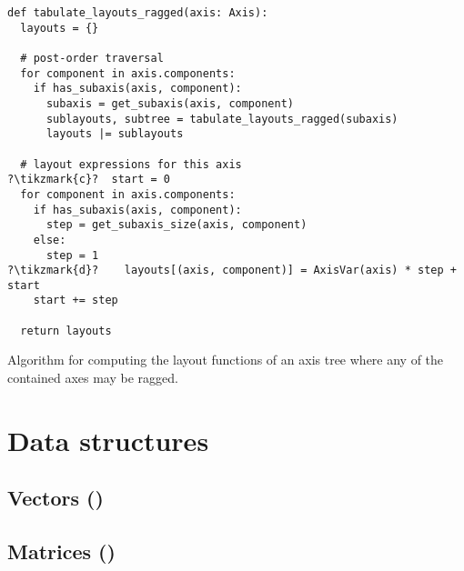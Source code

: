 \documentclass[thesis]{subfiles}
\begin{document}
\begin{algorithm}
  \begin{verbatim}
def tabulate_layouts_ragged(axis: Axis):
  layouts = {}

  # post-order traversal
  for component in axis.components:
    if has_subaxis(axis, component): 
      subaxis = get_subaxis(axis, component)
      sublayouts, subtree = tabulate_layouts_ragged(subaxis)
      layouts |= sublayouts

  # layout expressions for this axis
?\tikzmark{c}?  start = 0
  for component in axis.components:
    if has_subaxis(axis, component):
      step = get_subaxis_size(axis, component)
    else:
      step = 1
?\tikzmark{d}?    layouts[(axis, component)] = AxisVar(axis) * step + start
    start += step

  return layouts
  \end{verbatim}

  \caption{
    Algorithm for computing the layout functions of an axis tree where any of the contained axes may be ragged.
  }
  \label{alg:tabulate_layouts_ragged}
\end{algorithm}

\section{Data structures}

\subsection{Vectors ()}

\subsection{Matrices ()}
\end{document}
